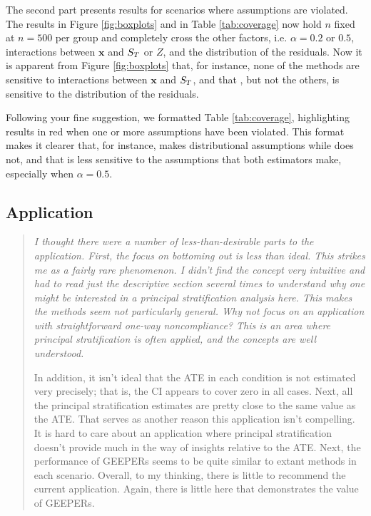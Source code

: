 \documentclass[]{article}
\newenvironment{itquote}
  {\begin{quote} \itshape}
  {\end{quote}\ignorespacesafterend}
\begin{document}
The second part presents results for scenarios where assumptions are violated. 
The results in Figure \ref{fig:boxplots} and in Table \ref{tab:coverage} now hold $n$ fixed at $n=500$ per group and completely cross the other factors, i.e. $\alpha=0.2$ or $0.5$, interactions between $\bm{x}$ and $S_T$ or $Z$, and the distribution of the residuals.
Now it is apparent from Figure \ref{fig:boxplots} that, for instance, none of the methods are sensitive to interactions between $\bm{x}$ and $S_T$, and that \pmm, but not the others, is sensitive to the distribution of the residuals.  

Following your fine suggestion, we formatted Table \ref{tab:coverage}, highlighting results in red when one or more assumptions have been violated.
This format makes it clearer that, for instance, \pmm makes distributional assumptions while \geepers does not, and that \geepers is less sensitive to the assumptions that both estimators make, especially when $\alpha=0.5$. 


\subsection{Application}
\begin{itquote}
I thought there were a number of less-than-desirable parts to the application. First, the focus on bottoming out is less than ideal. This strikes me as a fairly rare phenomenon. I didn't find the concept very intuitive and had to read just the descriptive section several times to understand why one might be interested in a principal stratification analysis here.  This makes the methods seem not particularly general.  Why not focus on an application with straightforward one-way noncompliance? This is an area where principal stratification is often applied, and the concepts are well understood.

In addition, it isn't ideal that the ATE in each condition is not estimated very precisely; that is, the CI appears to cover zero in all cases. Next, all the principal stratification estimates are pretty close to the same value as the ATE. That serves as another reason this application isn't compelling. It is hard to care about an application where principal stratification doesn't provide much in the way of insights relative to the ATE. Next, the performance of GEEPERs seems to be quite similar to extant methods in each scenario. Overall, to my thinking, there is little to recommend the current application. Again, there is little here that demonstrates the value of GEEPERs.
\end{itquote}
\end{document}
